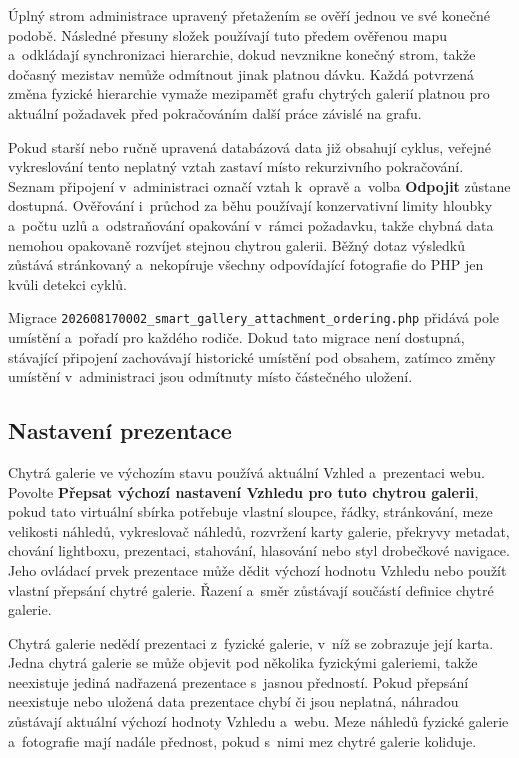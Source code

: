 \documentclass[11pt,a4paper]{article}
\newcommand{\ui}[1]{\textbf{#1}}
\begin{document}
Úplný strom administrace upravený přetažením se ověří jednou ve své konečné
podobě. Následné přesuny složek používají tuto předem ověřenou mapu a~odkládají
synchronizaci hierarchie, dokud nevznikne konečný strom, takže dočasný mezistav
nemůže odmítnout jinak platnou dávku. Každá potvrzená změna fyzické hierarchie
vymaže mezipaměť grafu chytrých galerií platnou pro aktuální požadavek před
pokračováním další práce závislé na grafu.

Pokud starší nebo ručně upravená databázová data již obsahují cyklus, veřejné
vykreslování tento neplatný vztah zastaví místo rekurzivního pokračování. Seznam
připojení v~administraci označí vztah k~opravě a~volba \ui{Odpojit} zůstane
dostupná. Ověřování i~průchod za běhu používají konzervativní limity hloubky
a~počtu uzlů a~odstraňování opakování v~rámci požadavku, takže chybná data
nemohou opakovaně rozvíjet stejnou chytrou galerii. Běžný dotaz výsledků zůstává
stránkovaný a~nekopíruje všechny odpovídající fotografie do PHP jen kvůli
detekci cyklů.

Migrace \texttt{202608170002\_smart\_gallery\_attachment\_ordering.php} přidává
pole umístění a~pořadí pro každého rodiče. Dokud tato migrace není dostupná,
stávající připojení zachovávají historické umístění pod obsahem, zatímco změny
umístění v~administraci jsou odmítnuty místo částečného uložení.

\subsection{Nastavení prezentace}

Chytrá galerie ve výchozím stavu používá aktuální Vzhled a~prezentaci webu.
Povolte \ui{Přepsat výchozí nastavení Vzhledu pro tuto chytrou galerii}, pokud
tato virtuální sbírka potřebuje vlastní sloupce, řádky, stránkování, meze
velikosti náhledů, vykreslovač náhledů, rozvržení karty galerie, překryvy
metadat, chování lightboxu, prezentaci, stahování, hlasování nebo styl
drobečkové navigace. Jeho ovládací prvek prezentace může dědit výchozí hodnotu
Vzhledu nebo použít vlastní přepsání chytré galerie. Řazení a~směr zůstávají
součástí definice chytré galerie.

Chytrá galerie nedědí prezentaci z~fyzické galerie, v~níž se zobrazuje její
karta. Jedna chytrá galerie se může objevit pod několika fyzickými galeriemi,
takže neexistuje jediná nadřazená prezentace s~jasnou předností. Pokud přepsání
neexistuje nebo uložená data prezentace chybí či jsou neplatná, náhradou
zůstávají aktuální výchozí hodnoty Vzhledu a~webu. Meze náhledů fyzické galerie
a~fotografie mají nadále přednost, pokud s~nimi mez chytré galerie koliduje.
\end{document}
